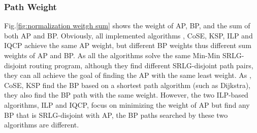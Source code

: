 \subsubsection{Path Weight}
Fig.\ref{fig:normalization weitgh sum} shows the weight of AP, BP, and the sum of both AP and BP. Obviously, all implemented algorithms \CI, CoSE, KSP, ILP and IQCP achieve the same AP weight, but different BP weights thus different sum weights of AP and BP. As all the algorithms solve the same Min-Min SRLG-disjoint routing program, although they find different SRLG-disjoint path pairs, they can all achieve the goal of finding the  AP with the same least weight.
As \CI, CoSE, KSP find the  BP based on a shortest path algorithm (such as Dijkstra), they also find the BP path with the same weight. However, the two ILP-based algorithms, ILP and IQCP, focus on minimizing the weight of AP but find any BP that is SRLG-disjoint with AP, the BP paths searched by these two algorithms are different.


